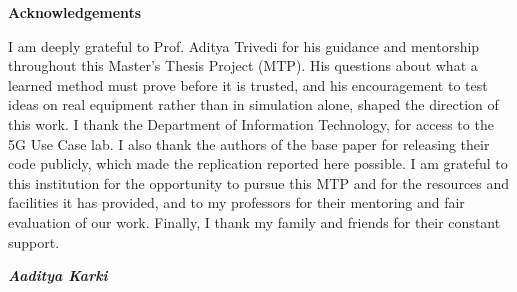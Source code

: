 \begin{center}
{\LARGE \bf Acknowledgements}
\end{center}
\noindent I am deeply grateful to Prof. Aditya Trivedi for his guidance and mentorship throughout this Master's Thesis Project (MTP). His questions about what a learned method must prove before it is trusted, and his encouragement to test ideas on real equipment rather than in simulation alone, shaped the direction of this work.
I thank the Department of Information Technology, for access to the 5G Use Case lab. I also thank the authors of the base paper for releasing their code publicly, which made the replication reported here possible.
I am grateful to this institution for the opportunity to pursue this MTP and for the resources and facilities it has provided, and to my professors for their mentoring and fair evaluation of our work. Finally, I thank my family and friends for their constant support.
\begin{flushright}
\textit{\textbf{Aaditya Karki}}
\end{flushright}

